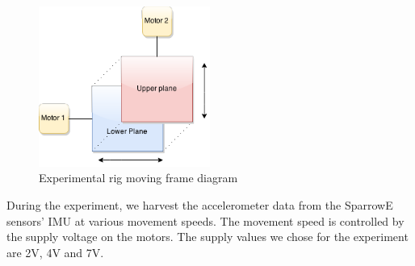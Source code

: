 \begin{figure}[ht] \centering
  \includegraphics[width=0.5\textwidth]{img/experimental-rig.png}
  \caption{Experimental rig moving frame diagram}
\end{figure}

During the experiment, we harvest the accelerometer data from the SparrowE sensors' IMU at various movement speeds.
The movement speed is controlled by the supply voltage on the motors. The supply values we chose for the experiment 
are 2V, 4V and 7V.
